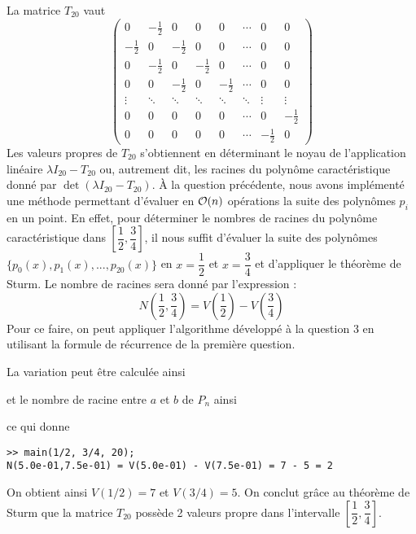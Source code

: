 La matrice $T_{20}$ vaut
\[
  \begin{pmatrix}
    0 & -\frac 12 & 0 & 0 & 0 & \cdots & 0 & 0\\
    -\frac 12 & 0 & -\frac 12 & 0 & 0 & \cdots & 0 & 0\\
    0 & -\frac 12 & 0 & -\frac 12 & 0 & \cdots & 0 & 0\\
    0 & 0 & -\frac 12 & 0 & -\frac 12 & \cdots & 0 & 0\\
    \vdots & \ddots& \ddots& \ddots& \ddots& \ddots & \vdots & \vdots\\
    0 & 0 & 0 & 0 & 0 & \cdots & 0 & -\frac 12\\
    0 & 0 & 0 & 0 & 0 & \cdots & -\frac 12 & 0
  \end{pmatrix}
\]
Les valeurs propres de $T_{20}$ s'obtiennent en déterminant le noyau
de l'application linéaire $\lambda I_{20} - T_{20}$ ou,
autrement dit, les racines du polynôme caractéristique donné par
$\det(\lambda I_{20} - T_{20})$.
À la question précédente, nous avons implémenté une méthode permettant
d'évaluer en $\mathcal{O}(n)$ opérations la suite des polynômes $p_i$ en un point.
En effet, pour déterminer le nombres de racines du polynôme caractéristique
dans $\left[ \dfrac{1}{2} , \dfrac{3}{4} \right]$,
il nous suffit d'évaluer la suite des polynômes
$ \{ p_0(x), p_1(x), ... , p_{20}(x) \}$ en $x=\dfrac{1}{2}$
et $x=\dfrac{3}{4}$ et d'appliquer le théorème de Sturm.
Le nombre de racines sera donné par l'expression :
$$N(\dfrac{1}{2} , \dfrac{3}{4}) = V(\dfrac{1}{2}) - V(\dfrac{3}{4})$$
Pour ce faire, on peut appliquer l'algorithme développé à la question 3
en utilisant la formule de récurrence de la première question.

La variation peut être calculée ainsi

et le nombre de racine entre $a$ et $b$ de $P_n$ ainsi

ce qui donne
\begin{lstlisting}
>> main(1/2, 3/4, 20);
N(5.0e-01,7.5e-01) = V(5.0e-01) - V(7.5e-01) = 7 - 5 = 2
\end{lstlisting}

On obtient ainsi $V(1/2) = 7$ et $V(3/4) = 5$.
On conclut grâce au théorème de Sturm que la matrice $T_{20}$
possède 2 valeurs propre dans l'intervalle
$\left[ \dfrac{1}{2} , \dfrac{3}{4} \right]$.
